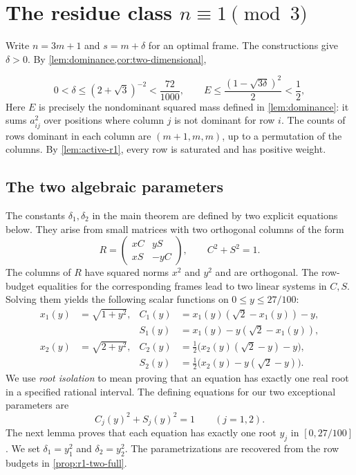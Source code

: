 \documentclass[11pt]{article}
\numberwithin{equation}{section}
\theoremstyle{definition}
\theoremstyle{definition}
\begin{document}
\section{The residue class \texorpdfstring{$n\equiv1\pmod3$}{n = 1 modulo 3}}
\label{sec:residue-one}

Write $n=3m+1$ and $s=m+\delta$ for an optimal frame.
The constructions give $\delta>0$.  By \cref{lem:dominance,cor:two-dimensional},

\begin{equation}
  0<\delta\le (2+\sqrt3)^{-2}<\frac{72}{1000},\qquad
  E\le\frac{(1-\sqrt{3\delta})^2}{2}<\frac12,
  \label{eq:r1-preliminary}
\end{equation}
Here $E$ is precisely the nondominant squared mass defined in
\cref{lem:dominance}: it sums $a_{ij}^2$ over positions where column
$j$ is not dominant for row $i$. The counts of rows dominant in each
column are $(m+1,m,m)$, up to a permutation of the columns.
By \cref{lem:active-r1}, every row is saturated and has positive weight.

\subsection{The two algebraic parameters}\label{sec:algebraic-parameters}

The constants $\delta_1,\delta_2$ in the main theorem are defined
by two explicit equations below. They arise from small matrices with
two orthogonal columns of the form
\[
 R=\begin{pmatrix}xC&yS\\xS&-yC\end{pmatrix},
 \qquad C^2+S^2=1.
\]
The columns of $R$ have squared norms $x^2$ and $y^2$ and are
orthogonal.  The row-budget equalities for the corresponding frames
lead to two linear systems in $C,S$.  Solving them yields the
following scalar functions on $0\le y\le27/100$:
\begin{align*}
 x_1(y)&=\sqrt{1+y^2},&
 C_1(y)&=x_1(y)(\sqrt2-x_1(y))-y,\\
 &&S_1(y)&=x_1(y)-y(\sqrt2-x_1(y)),\\
 x_2(y)&=\sqrt{2+y^2},&
 C_2(y)&=\tfrac12\bigl(x_2(y)(\sqrt2-y)-y\bigr),\\
 &&S_2(y)&=\tfrac12\bigl(x_2(y)-y(\sqrt2-y)\bigr).
\end{align*}
We use \emph{root isolation} to mean proving that an equation has
exactly one real root in a specified rational interval.
The defining equations for our two exceptional parameters are
\begin{equation}\label{eq:root-equations}
 C_j(y)^2+S_j(y)^2=1\qquad(j=1,2).
\end{equation}
The next lemma proves that each equation has exactly one root
$y_j$ in $[0,27/100]$.  We set $\delta_1=y_1^2$ and $\delta_2=y_2^2$.
The parametrizations are recovered from the row budgets in
\cref{prop:r1-two-full}.
\end{document}
